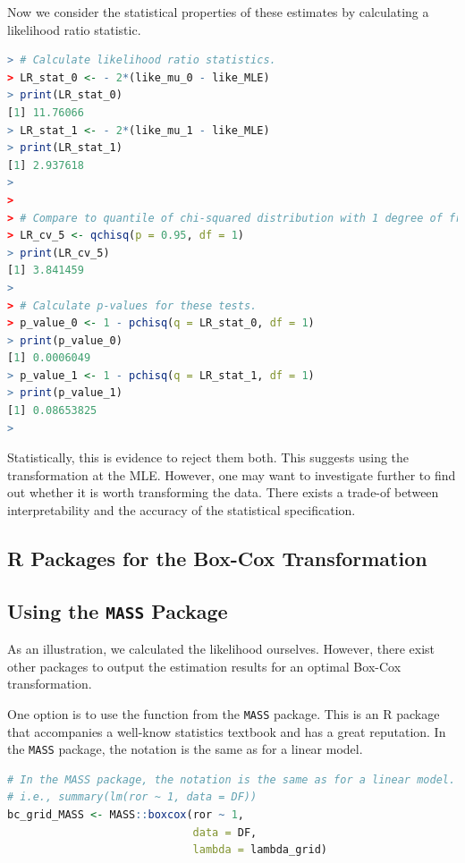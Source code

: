 \documentclass[11pt]{paper}
\begin{document}
Now we consider the statistical properties of these estimates
by calculating a likelihood ratio statistic.

\begin{lstlisting}[language=R]
> # Calculate likelihood ratio statistics.
> LR_stat_0 <- - 2*(like_mu_0 - like_MLE)
> print(LR_stat_0)
[1] 11.76066
> LR_stat_1 <- - 2*(like_mu_1 - like_MLE)
> print(LR_stat_1)
[1] 2.937618
> 
> 
> # Compare to quantile of chi-squared distribution with 1 degree of freedom.
> LR_cv_5 <- qchisq(p = 0.95, df = 1)
> print(LR_cv_5)
[1] 3.841459
> 
> # Calculate p-values for these tests.
> p_value_0 <- 1 - pchisq(q = LR_stat_0, df = 1)
> print(p_value_0)
[1] 0.0006049
> p_value_1 <- 1 - pchisq(q = LR_stat_1, df = 1)
> print(p_value_1)
[1] 0.08653825
> 
\end{lstlisting}

Statistically, this is evidence to reject them both.
This suggests using the transformation at the MLE.
However, one may want to investigate further 
to find out whether it is worth 
transforming the data. 
There exists a trade-of between interpretability and 
the accuracy of the statistical specification. 


\clearpage

\subsection{\textsf{R} Packages for the Box-Cox Transformation}
\subsection*{Using the \texttt{MASS} Package}

As an illustration, we calculated
the likelihood ourselves.
However, there exist other packages
to output the estimation results for
an optimal Box-Cox transformation.

One option is to use the function from the \texttt{MASS} package.
This is an \textsf{R} package that accompanies a well-know statistics textbook
and has a great reputation. 
In the \texttt{MASS} package, the notation is the same as for a linear model.


\begin{lstlisting}[language=R]
# In the MASS package, the notation is the same as for a linear model.
# i.e., summary(lm(ror ~ 1, data = DF))
bc_grid_MASS <- MASS::boxcox(ror ~ 1,
                             data = DF,
                             lambda = lambda_grid)
\end{lstlisting}
\end{document}
